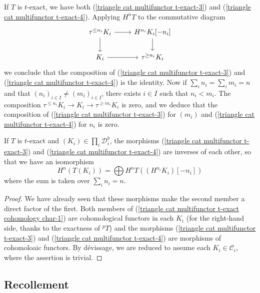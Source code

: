 If $T$ is $t$-exact, we have both (\ref{triangle cat multifunctor t-exact-3}) and (\ref{triangle cat multifunctor t-exact-4}). Applying $H^nT$ to the commutative diagram
\[\begin{tikzcd}
\tau^{\leq n_i}K_i\ar[d]\ar[r]&H^{n_i}K_i[-n_i]\ar[d]\\
K_i\ar[r]&\tau^{\geq n_i}K_i
\end{tikzcd}\]
we conclude that the composition of (\ref{triangle cat multifunctor t-exact-3}) and (\ref{triangle cat multifunctor t-exact-4}) is the identity. Now if $\sum_in_i=\sum_im_i=n$ and that $(n_i)_{i\in I}\neq (m_i)_{i\in I}$, there exists $i\in I$ such that $n_i<m_i$. The composition $\tau^{\leq n_i}K_i\to K_i\to\tau^{\geq m_i}K_i$ is zero, and we deduce that the composition of (\ref{triangle cat multifunctor t-exact-3}) for $(m_i)$ and (\ref{triangle cat multifunctor t-exact-4}) for $n_i$ is zero.

\begin{proposition}\label{triangle cat multifunctor t-exact cohomology char}
If $T$ is $t$-exact and $(K_i)\in\prod_i\mathcal{D}_i^b$, the morphisms (\ref{triangle cat multifunctor t-exact-3}) and (\ref{triangle cat multifunctor t-exact-4}) are inverses of each other, so that we have an isomorphism
\begin{equation}\label{triangle cat multifunctor t-exact cohomology char-1}
H^n(T(K_i))=\bigoplus H^nT((H^{n_i}K_i)[-n_i])
\end{equation}
where the sum is taken over $\sum_in_i=n$.
\end{proposition}
\begin{proof}
We have already seen that these morphisms make the second member a direct factor of the first. Both members of (\ref{triangle cat multifunctor t-exact cohomology char-1}) are cohomological functors in each $K_i$ (for the right-hand side, thanks to the exactness of ${^p\!T}$) and the morphisms (\ref{triangle cat multifunctor t-exact-3}) and (\ref{triangle cat multifunctor t-exact-4}) are morphisms of cohomoloaic functors. By d\'evissage, we are reduced to assume each $K_i\in\mathcal{C}_i$, where the assertion is trivial.
\end{proof}

\subsection{Recollement}

